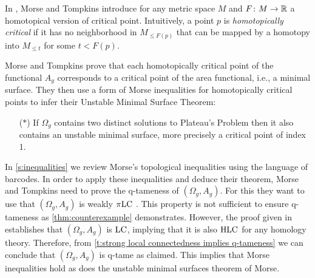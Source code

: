 In \cite[p.445]{Morse.1939}, Morse and Tompkins introduce for any metric space $M$ and $F \colon M \to \mathbb{R}$ a homotopical version of critical point.
Intuitively, a point $p$ is \textit{homotopically critical} if it has no neighborhood in $M_{\leq F(p)}$ that can be mapped by a homotopy into $M_{\leq t}$ for some $t<F(p)$.

Morse and Tompkins prove that each homotopically critical point of the functional $A_g$ corresponds to a critical point of the area functional, i.e., a minimal surface.
They then use a form of Morse inequalities for homotopically critical points
to infer their Unstable Minimal Surface Theorem:
\begin{itemize}
    \item[($\ast$)] If $\Omega_g$ contains two distinct solutions to Plateau's Problem then it also contains an unstable minimal surface, more precisely a critical point of index 1.
\end{itemize}

In \cref{s:inequalities} we review Morse's topological inequalities using the language of barcodes.
In order to apply these inequalities and deduce their theorem, Morse and Tompkins need to prove the \mbox{q-tameness} of $(\Omega_g, A_g)$. 
For this they want to use that $(\Omega_g, A_g)$ is weakly $\pi\mathrm{LC}$ \cite[p.431]{Morse.1940}. This property is not sufficient to ensure q-tameness as \cref{thm:counterexample} demonstrates.
However, the proof given in \cite[p.464]{Morse.1939} establishes that $(\Omega_g, A_g)$ is $\mathrm{LC}$, implying that it is also $\mathrm{HLC}$ for any homology theory.
Therefore, from \cref{t:strong local connectedness implies q-tameness} we can conclude that $(\Omega_g, A_g)$ is q-tame as claimed.
This implies that Morse inequalities hold as does the unstable minimal surfaces theorem of Morse.




